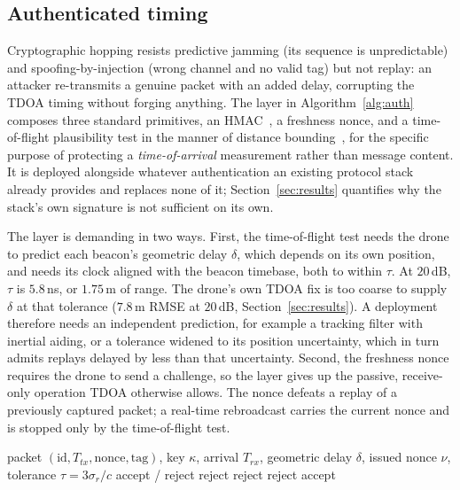 \documentclass[journal]{IEEEtran}
\begin{document}
\subsection{Authenticated timing}\label{sec:auth}
Cryptographic hopping resists predictive jamming (its sequence is
unpredictable) and spoofing-by-injection (wrong channel and no valid tag) but
not replay: an
attacker re-transmits a genuine packet with an added delay, corrupting the TDOA
timing without forging anything. The layer in Algorithm~\ref{alg:auth} composes
three standard primitives, an HMAC~\cite{ref21}, a freshness nonce, and a
time-of-flight plausibility test in the manner of distance
bounding~\cite{ref23}, for the specific purpose of protecting a
\emph{time-of-arrival} measurement rather than message content. It is deployed
alongside whatever authentication an existing protocol stack already provides
and replaces none of it; Section~\ref{sec:results} quantifies why the stack's
own signature is not sufficient on its own.

The layer is demanding in two ways. First, the time-of-flight test needs the
drone to predict each beacon's geometric delay $\delta$, which depends on its own
position, and needs its clock aligned with the beacon timebase, both to within
$\tau$. At $20$\,dB, $\tau$ is $5.8$\,ns, or $1.75$\,m of range. The drone's own
TDOA fix is too coarse to supply $\delta$ at that tolerance ($7.8$\,m RMSE at
$20$\,dB, Section~\ref{sec:results}). A deployment therefore needs an independent
prediction, for example a tracking filter with inertial aiding, or a tolerance
widened to its position uncertainty, which in turn admits replays delayed by
less than that uncertainty. Second, the freshness nonce requires the drone to
send a challenge, so the layer gives up the passive, receive-only operation
TDOA otherwise allows. The nonce defeats a replay of a previously captured
packet; a real-time rebroadcast carries the current nonce and is stopped only by
the time-of-flight test.

\begin{algorithm}[t]
\caption{Authenticated-timing verification at the drone}\label{alg:auth}
\begin{algorithmic}[1]
\Require packet $(\text{id},T_{tx},\text{nonce},\text{tag})$, key $\kappa$,
arrival $T_{rx}$, geometric delay $\delta$, issued nonce $\nu$, tolerance
$\tau=3\sigma_r/c$
\Ensure accept / reject
      \State \Return reject 
\EndIf
{} \State \Return reject 
\EndIf
{}
      \State \Return reject 
\EndIf
\State \Return accept
\end{algorithmic}
\end{algorithm}
\end{document}
